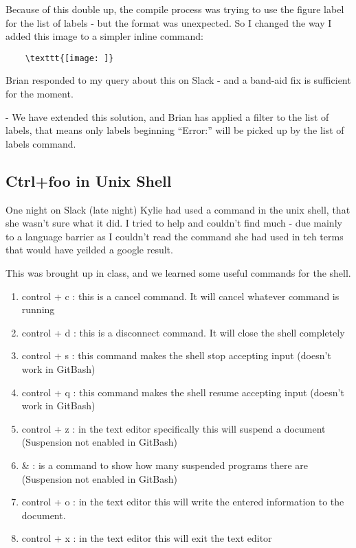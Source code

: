 \documentclass{article}
\begin{document}
Because of this double up, the compile process was trying to use the figure label for the list of labels - but the format was unexpected. So I changed the way I added this image to a simpler inline command:
\begin{verbatim}
    \texttt{[image: ]}
\end{verbatim}

Brian responded to my query about this on Slack - and a band-aid fix is sufficient for the moment.

- We have extended this solution, and Brian has applied a filter to the list of labels, that means only labels beginning ``Error:'' will be picked up by the list of labels command. 

\subsection{Ctrl+foo in Unix Shell}
\label{Error: Ctrl + foo in Unix Shell}

One night on Slack (late night) Kylie had used a command in the unix shell, that she wasn't sure what it did. I tried to help and couldn't find much - due mainly to a language barrier as I couldn't read the command she had used in teh terms that would have yeilded a google result.

This was brought up in class, and we learned some useful commands for the shell. 
\begin{enumerate}
    \item control + c : this is a cancel command. It will cancel whatever command is running
    \item  control + d : this is a disconnect command. It will close the shell completely
    \item  control + s : this command makes the shell stop accepting input (doesn't work in GitBash)
    \item  control + q : this command makes the shell resume accepting input (doesn't work in GitBash)
    \item  control + z : in the text editor specifically this will suspend a document (Suspension not enabled in GitBash)
    \item \& : is a command to show how many suspended programs there are (Suspension not enabled in GitBash)
    \item control + o : in the text editor this will write the entered information to the document.
    \item control + x : in the text editor this will exit the text editor
\end{enumerate}
    
\end{document}

